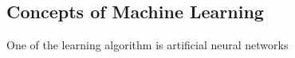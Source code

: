 \subsection{Concepts of Machine Learning}
One of the learning algorithm is artificial neural networks 